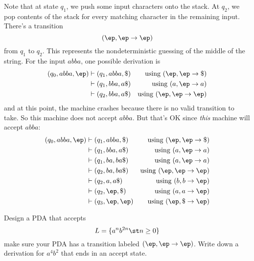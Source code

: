 \begin{eg}
\begin{center}
\end{center}
Note that at state $q_1$, we push some input characters onto the stack.
At $q_2$, we pop contents of the stack for every matching character in the
remaining input.
There's a transition
\[
(\ep, \ep \rightarrow \ep)
\]
from $q_1$ to $q_2$.
This represents the nondeterministic guessing of the middle of the string.
For the input $abba$, one possible derivation is
\begin{align*}
(q_0, abba, \ep)
&\vdash (q_1, abba, \$) &\text{using $(\ep, \ep \rightarrow \$)$} \\
&\vdash (q_1, bba, a\$) &\text{using $(a, \ep \rightarrow a)$} \\
&\vdash (q_2, bba, a\$) &\text{using $(\ep, \ep \rightarrow \ep)$}
\end{align*}
and at this point, the machine crashes because there is no valid transition
to take.
So this machine does not accept $abba$.
But that's OK since \textit{ this} machine will accept $abba$:
\begin{align*}
(q_0, abba, \ep)
&\vdash (q_1, abba, \$) &\text{using $(\ep, \ep \rightarrow \$)$} \\
&\vdash (q_1, bba, a\$) &\text{using $(a, \ep \rightarrow a)$} \\
&\vdash (q_1, ba, ba\$) &\text{using $(a, \ep \rightarrow a)$} \\
&\vdash (q_2, ba, ba\$) &\text{using $(\ep, \ep \rightarrow \ep)$} \\
&\vdash (q_2, a, a\$) &\text{using $(b, b \rightarrow \ep)$} \\
&\vdash (q_2, \ep, \$) &\text{using $(a, a \rightarrow \ep)$} \\
&\vdash (q_3, \ep, \ep) &\text{using $(\ep, \$ \rightarrow \ep)$} \\
\end{align*}
\end{eg}



\newpage
\begin{ex}
Design a PDA that accepts
\[
L = \{a^n b^{2n} \st n \geq 0\}
\]
make sure your PDA has a transition labeled $(\ep, \ep\rightarrow\ep)$. 
Write down a derivation for $a^4 b^2$ that ends in an accept state.
\end{ex}



